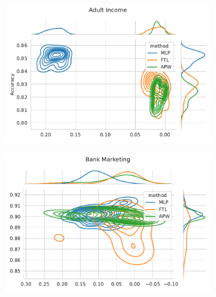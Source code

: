 \begin{figure}
\centering
\caption{Metric distribution optimizing Accuracy and Statistical Parity in comparison with Fair Transition Loss across multiple resample runs. Corresponding values available at Table~\ref{tab:complete_acc_parity}.}
\label{fig:complete_acc_parity}
\begin{subfigure}{.45\linewidth}
    \includegraphics[width=1\linewidth]{images/pareto_acc_parity_adult.pdf}
\end{subfigure}
\begin{subfigure}{.45\linewidth}
    \includegraphics[width=1\linewidth]{images/pareto_acc_parity_bank.pdf}
\end{subfigure}


\end{figure}
